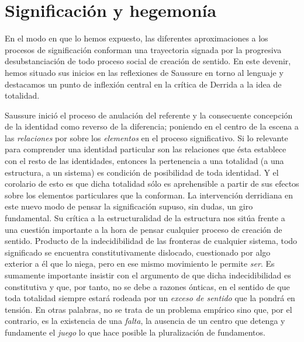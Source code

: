 \section{Significación y hegemonía}

En el modo en que lo hemos expuesto, las diferentes aproximaciones a los procesos de significación conforman una trayectoria signada por la progresiva desubstanciación de todo proceso social de creación de sentido. En este devenir, hemos situado sus inicios en las reflexiones de Saussure en torno al lenguaje y destacamos un punto de inflexión central en la crítica de Derrida a la idea de totalidad.

Saussure inició el proceso de anulación del referente y la consecuente concepción de la identidad como reverso de la diferencia; poniendo en el centro de la escena a las \emph{relaciones} por sobre los \emph{elementos} en el proceso significativo. Si lo relevante para comprender una identidad particular son las relaciones que ésta establece con el resto de las identidades, entonces la pertenencia a una totalidad (a una estructura, a un sistema) es condición de posibilidad de toda identidad. Y el corolario de esto es que dicha totalidad sólo es aprehensible a partir de sus efectos sobre los elementos particulares que la conforman. La intervención derridiana en este nuevo modo de pensar la significación supuso, sin dudas, un giro fundamental. Su crítica a la estructuralidad de la estructura nos sitúa frente a una cuestión importante a la hora de pensar cualquier proceso de creación de sentido. Producto de la indecidibilidad de las fronteras de cualquier sistema, todo significado se encuentra constitutivamente dislocado, cuestionado por algo exterior a él que lo niega, pero en ese mismo movimiento le permite \emph{ser}. Es sumamente importante insistir con el argumento de que dicha indecidibilidad es constitutiva y que, por tanto, no se debe a razones ónticas, en el sentido de que toda totalidad siempre estará rodeada por un \emph{exceso de sentido} que la pondrá en tensión. En otras palabras, no se trata de un problema empírico sino que, por el contrario, es la existencia de una \emph{falta}, la ausencia de un centro que detenga y fundamente el \emph{juego} lo que hace posible la pluralización de fundamentos.

